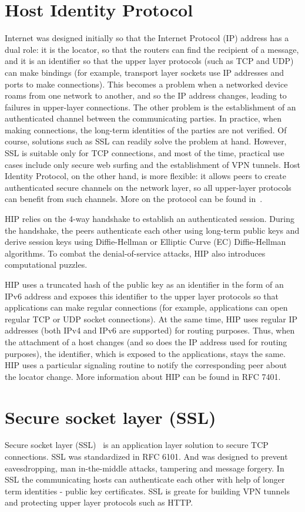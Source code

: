 \section{Host Identity Protocol}

Internet was designed initially so that the Internet Protocol (IP) address has a dual role: it 
is the locator, so that the routers can find the recipient of a message, and it is an identifier 
so that the upper layer protocols (such as TCP and UDP) can make bindings (for example, transport 
layer sockets use IP addresses and ports to make connections). This becomes a problem when a networked 
device roams from one network to another, and so the IP address changes, leading to failures in 
upper-layer connections. The other problem is the establishment of an authenticated channel between 
the communicating parties. In practice, when making connections, the long-term identities of the parties 
are not verified. Of course, solutions such as SSL can readily solve the problem at hand. However, SSL 
is suitable only for TCP connections, and most of the time, practical use cases include only secure web 
surfing and the establishment of VPN tunnels. Host Identity Protocol, on the other hand, is more flexible: 
it allows peers to create authenticated secure channels on the network layer, so all upper-layer protocols 
can benefit from such channels. More on the protocol can be found in~\cite{gurtov:hip}.

HIP relies on the 4-way handshake to establish an authenticated session. During the handshake, the 
peers authenticate each other using long-term public keys and derive session keys using Diffie-Hellman 
or Elliptic Curve (EC) Diffie-Hellman algorithms. To combat the denial-of-service attacks, HIP also 
introduces computational puzzles. 

HIP uses a truncated hash of the public key as an identifier in the form of an IPv6 address and 
exposes this identifier to the upper layer protocols so that applications can make regular 
connections (for example, applications can open regular TCP or UDP socket connections). At the 
same time, HIP uses regular IP addresses (both IPv4 and IPv6 are supported) for routing purposes. 
Thus, when the attachment of a host changes (and so does the IP address used for routing purposes), 
the identifier, which is exposed to the applications, stays the same. HIP uses a particular 
signaling routine to notify the corresponding peer about the locator change. More information 
about HIP can be found in RFC 7401. 

\section{Secure socket layer (SSL)}
Secure socket layer (SSL)~\cite{ssl} is an application layer solution to secure TCP connections. 
SSL was standardized in RFC 6101. And was designed to prevent eavesdropping, man 
in-the-middle attacks, tampering and message forgery. In SSL the communicating 
hosts can authenticate each other with help of longer term identities - public key certificates.
SSL is greate for building VPN tunnels and protecting upper layer protocols such as HTTP.
